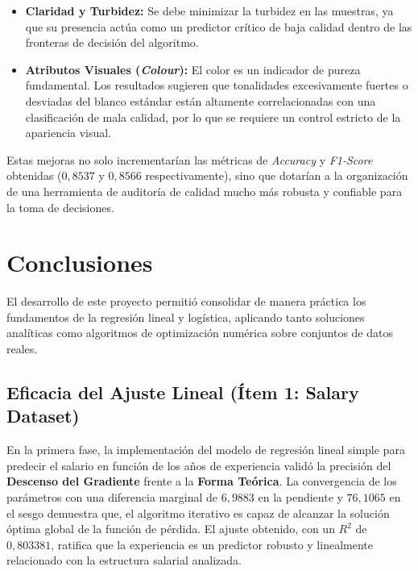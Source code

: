 \documentclass[12pt,a4paper]{article}
\begin{document}
\begin{itemize}
\begin{enumerate}
\begin{itemize}
			\item \textbf{Claridad y Turbidez:} Se debe minimizar la turbidez en las muestras, ya que su presencia actúa como un predictor crítico de baja calidad dentro de las fronteras de decisión del algoritmo.
			
			\item \textbf{Atributos Visuales (\textit{Colour}):} El color es un indicador de pureza fundamental. Los resultados sugieren que tonalidades excesivamente fuertes o desviadas del blanco estándar están altamente correlacionadas con una clasificación de mala calidad, por lo que se requiere un control estricto de la apariencia visual.
		\end{itemize}
	\end{enumerate}
	
	Estas mejoras no solo incrementarían las métricas de \textit{Accuracy} y \textit{F1-Score} obtenidas ($0,8537$ y $0,8566$ respectivamente), sino que dotarían a la organización de una herramienta de auditoría de calidad mucho más robusta y confiable para la toma de decisiones.
\end{itemize}
\newpage
\section*{\centering Conclusiones}

El desarrollo de este proyecto permitió consolidar de manera práctica los fundamentos de la regresión lineal y logística, aplicando tanto soluciones analíticas como algoritmos de optimización numérica sobre conjuntos de datos reales.

\subsection*{Eficacia del Ajuste Lineal (Ítem 1: Salary Dataset)}
En la primera fase, la implementación del modelo de regresión lineal simple para predecir el salario en función de los años de experiencia validó la precisión del \textbf{Descenso del Gradiente} frente a la \textbf{Forma Teórica}. La convergencia de los parámetros con una diferencia marginal de $6,9883$ en la pendiente y $76,1065$ en el sesgo demuestra que, el algoritmo iterativo es capaz de alcanzar la solución óptima global de la función de pérdida. El ajuste obtenido, con un $R^2$ de $0,803381$, ratifica que la experiencia es un predictor robusto y linealmente relacionado con la estructura salarial analizada.
\end{document}
